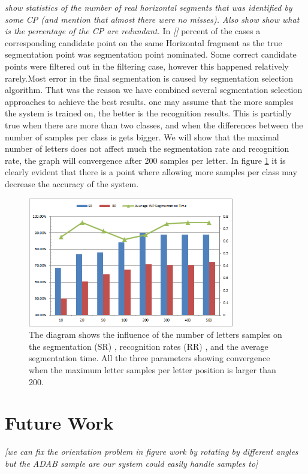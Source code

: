 \documentclass[journal,compsoc]{IEEEtran}
\begin{document}
\emph{ show statistics of the number of real horizontal segments that was identified by some CP (and mention that almost there were no misses). Also show show what is the percentage of the CP are redundant.}
In \emph{[]} percent of the cases a corresponding candidate point on the same Horizontal fragment as the true segmentation point was  segmentation point nominated. Some correct candidate points were filtered out in the filtering case, however this happened relatively rarely.Most error in the final segmentation is caused by segmentation selection algorithm. That was the reason we have combined several segmentation selection approaches to achieve the best results.
one may assume that the more samples the system is trained on, the better is the recognition results. This is partially true when there are more than two classes, and when the differences between the number of samples per class is gets bigger.
We will show that the maximal number of letters does not affect much the segmentation rate and recognition rate, the graph will convergence after 200 samples per letter. In figure \ref{fig:num_letter_impact} it is clearly evident that there is a point where allowing more samples per class may decrease the accuracy of the system.

\begin{figure}[h]
\centering
\includegraphics[width=9cm]{./figures/num_letter_impact}
\caption{The diagram shows the influence of the number of letters samples on the segmentation (SR) , recognition rates (RR) , and the average segmentation time. All the three parameters showing convergence when the maximum letter samples per letter position is larger than 200. }
\label{fig:num_letter_impact}
\end{figure}


\section{Future Work}
\label{sec:future_work}
\emph{[we can fix the orientation problem in figure work by rotating by different angles but the ADAB sample are our system could easily handle samples to]}
\end{document}
